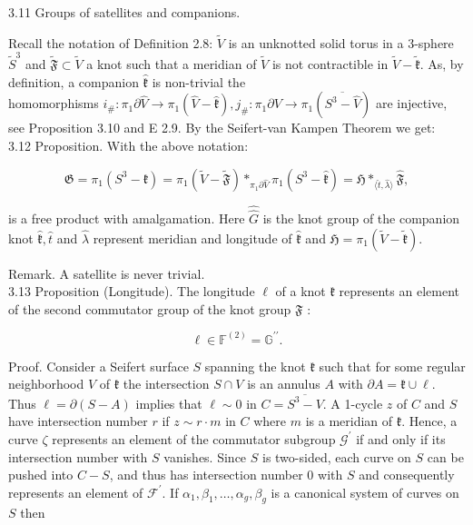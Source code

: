 \documentclass[10pt, letterpaper]{article}
\begin{document}
3.11 Groups of satellites and companions. 


Recall the notation of Definition 2.8: $\widetilde{V}$ is an unknotted solid torus in a 3-sphere $\widetilde{S}^{3}$ and $\widetilde{\mathfrak{F}} \subset \widetilde{V}$ a knot such that a meridian of $\widetilde{V}$ is not contractible in $\widetilde{V}-\widetilde{\mathfrak{k}}$. As, by definition, a companion $\widehat{\mathfrak{k}}$ is non-trivial the\\
homomorphisms $i_{\#}: \pi_{1} \partial \widehat{V} \rightarrow \pi_{1}(\widehat{V}-\widehat{\mathfrak{k}}), j_{\#}: \pi_{1} \partial V \rightarrow \pi_{1}\left(\overline{S^{3}-\widehat{V}}\right)$ are injective, see Proposition 3.10 and E 2.9. By the Seifert-van Kampen Theorem we get:\\
3.12 Proposition. With the above notation:

$$
\mathfrak{G}=\pi_{1}\left(S^{3}-\mathfrak{k}\right)=\pi_{1}(\widetilde{V}-\widetilde{\mathfrak{F}}) *_{\pi_{1} \partial \widehat{V}} \pi_{1}\left(S^{3}-\widehat{\mathfrak{k}}\right)=\mathfrak{H} *_{\langle\widehat{t}, \widehat{\lambda}\rangle} \widehat{\mathfrak{F}},
$$

is a free product with amalgamation. Here $\widehat{\widehat{G}}$ is the knot group of the companion knot $\widehat{\mathfrak{k}}, \widehat{t}$ and $\widehat{\lambda}$ represent meridian and longitude of $\widehat{\mathfrak{k}}$ and $\mathfrak{H}=\pi_{1}(\widetilde{V}-\widetilde{\mathfrak{k}})$.

Remark. A satellite is never trivial.\\
3.13 Proposition (Longitude). The longitude $\ell$ of a knot $\mathfrak{k}$ represents an element of the second commutator group of the knot group $\mathfrak{F}$ :

$$
\ell \in \mathbb{F}^{(2)}=\mathbb{G}^{\prime \prime} .
$$

Proof. Consider a Seifert surface $S$ spanning the knot $\mathfrak{k}$ such that for some regular neighborhood $V$ of $\mathfrak{k}$ the intersection $S \cap V$ is an annulus $A$ with $\partial A=\mathfrak{k} \cup \ell$. Thus $\ell=\partial(S-A)$ implies that $\ell \sim 0$ in $C=\overline{S^{3}-V}$. A 1-cycle $z$ of $C$ and $S$ have intersection number $r$ if $z \sim r \cdot m$ in $C$ where $m$ is a meridian of $\mathfrak{k}$. Hence, a curve $\zeta$ represents an element of the commutator subgroup $\mathcal{G}^{\prime}$ if and only if its intersection number with $S$ vanishes. Since $S$ is two-sided, each curve on $S$ can be pushed into $C-S$, and thus has intersection number 0 with $S$ and consequently represents an element of $\mathscr{F}^{\prime}$. If $\alpha_{1}, \beta_{1}, \ldots, \alpha_{g}, \beta_{g}$ is a canonical system of curves on $S$ then
\end{document}
